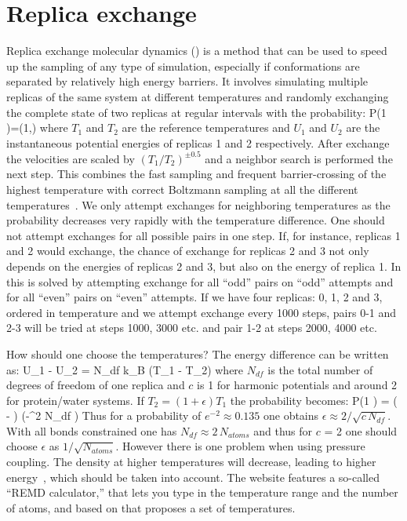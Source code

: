 \section{Replica exchange}
Replica exchange molecular dynamics ()
is a method that can be used to speed up
the sampling of any type of simulation, especially if
conformations are separated by relatively high energy barriers.
It involves simulating multiple replicas of the same system
at different temperatures and randomly exchanging the complete state
of two replicas at regular intervals with the probability:
\beq
P(1 )=\min\left(1,\exp{} \right)
\eeq
where $T_1$ and $T_2$ are the reference temperatures and $U_1$ and $U_2$
are the instantaneous potential energies of replicas 1 and 2 respectively.
After exchange the velocities are scaled by $(T_1/T_2)^{\pm0.5}$
and a neighbor search is performed the next step.
This combines the fast sampling and frequent barrier-crossing
of the highest temperature with correct Boltzmann sampling at
all the different temperatures~\cite{Hukushima96a,Sugita99}.
We only attempt exchanges for neighboring temperatures as the probability
decreases very rapidly with the temperature difference.
One should not attempt exchanges for all possible pairs in one step.
If, for instance, replicas 1 and 2 would exchange, the chance of
exchange for replicas 2 and 3 not only depends on the energies of
replicas 2 and 3, but also on the energy of replica 1.
In {\gromacs} this is solved by attempting exchange for all ``odd''
pairs on ``odd'' attempts and for all ``even'' pairs on ``even'' attempts.
If we have four replicas: 0, 1, 2 and 3, ordered in temperature
and we attempt exchange every 1000 steps, pairs 0-1 and 2-3
will be tried at steps 1000, 3000 etc. and pair 1-2 at steps 2000, 4000 etc.

How should one choose the temperatures?
The energy difference can be written as:
\beq
U_1 - U_2 =  N_{df}  k_B (T_1 - T_2)
\eeq
where $N_{df}$ is the total number of degrees of freedom of one replica
and $c$ is 1 for harmonic potentials and around 2 for protein/water systems.
If $T_2 = (1+\epsilon) T_1$ the probability becomes:
\beq
P(1 )
  = \exp\left( - \right)
\approx \exp\left(-\epsilon^2  N_{df} \right)
\eeq
Thus for a probability of $e^{-2}\approx 0.135$
one obtains $\epsilon \approx 2/\sqrt{c\,N_{df}}$.
With all bonds constrained one has $N_{df} \approx 2\, N_{atoms}$
and thus for $c$ = 2 one should choose $\epsilon$ as $1/\sqrt{N_{atoms}}$.
However there is one problem when using pressure coupling. The density at
higher temperatures will decrease, leading to higher energy~\cite{Seibert2005a},
which should be taken into account. The {\gromacs} website features a
so-called ``REMD calculator,'' that lets you type in the temperature range and
the number of atoms, and based on that proposes a set of temperatures.

